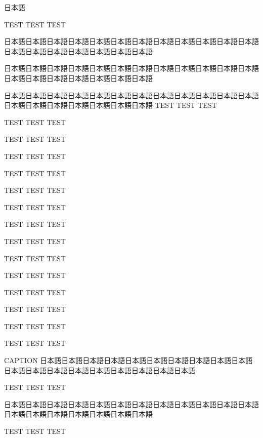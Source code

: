 \begin{rv@squarebox@nocaption}
日本語

TEST TEST TEST

日本語日本語日本語日本語日本語日本語日本語日本語日本語日本語日本語日本語日本語日本語日本語日本語日本語日本語日本語

\end{rv@squarebox@nocaption}

\begin{rv@squarebox@nocaption}
日本語日本語日本語日本語日本語日本語日本語日本語日本語日本語日本語日本語日本語日本語日本語日本語日本語日本語日本語

日本語日本語日本語日本語日本語日本語日本語日本語日本語日本語日本語日本語日本語日本語日本語日本語日本語日本語日本語
TEST TEST TEST

TEST TEST TEST

TEST TEST TEST

TEST TEST TEST

TEST TEST TEST

TEST TEST TEST

TEST TEST TEST

TEST TEST TEST

TEST TEST TEST

TEST TEST TEST

TEST TEST TEST

TEST TEST TEST

TEST TEST TEST

TEST TEST TEST

TEST TEST TEST

\end{rv@squarebox@nocaption}

\begin{rv@squarebox@caption}{CAPTION}
日本語日本語日本語日本語日本語日本語日本語日本語日本語日本語日本語日本語日本語日本語日本語日本語日本語日本語日本語

TEST TEST TEST

\end{rv@squarebox@caption}

\clearpage

\begin{rv@marker@nocaption}[rv marker markchar={?}, rv marker markcolback=red, rv marker markcoltext=blue]
日本語日本語日本語日本語日本語日本語日本語日本語日本語日本語日本語日本語日本語日本語日本語日本語日本語日本語日本語

TEST TEST TEST

\end{rv@marker@nocaption}

